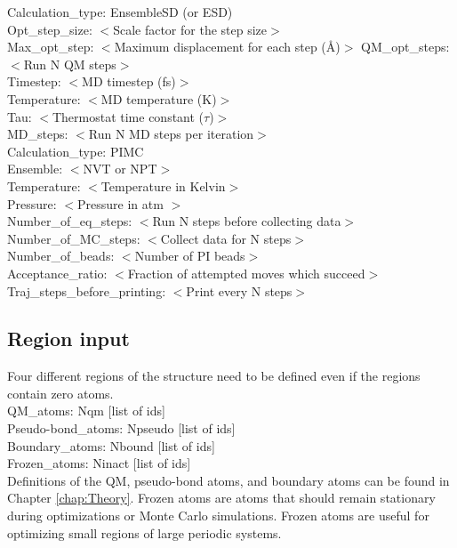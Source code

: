 \documentclass[12pt]{report}
\begin{document}
Calculation\_type: EnsembleSD (or ESD) \\
Opt\_step\_size: $<$Scale factor for the step size$>$ \\
Max\_opt\_step: $<$Maximum displacement for each step (\AA)$>$
QM\_opt\_steps: $<$Run N QM steps$>$ \\
Timestep: $<$MD timestep (fs)$>$ \\
Temperature: $<$MD temperature (K)$>$ \\
Tau: $<$Thermostat time constant ($\tau$)$>$ \\
MD\_steps: $<$Run N MD steps per iteration$>$ \\

Calculation\_type: PIMC \\
Ensemble: $<$NVT or NPT$>$ \\
Temperature: $<$Temperature in Kelvin$>$ \\
Pressure: $<$Pressure in atm $>$ \\
Number\_of\_eq\_steps: $<$Run N steps before collecting data$>$ \\
Number\_of\_MC\_steps: $<$Collect data for N steps$>$ \\
Number\_of\_beads: $<$Number of PI beads$>$ \\
Acceptance\_ratio: $<$Fraction of attempted moves which succeed$>$ \\
Traj\_steps\_before\_printing: $<$Print every N steps$>$ \\

\subsection{Region input}

Four different regions of the structure need to be defined even if the
regions contain zero atoms. \\

QM\_atoms: Nqm [list of ids] \\
Pseudo-bond\_atoms: Npseudo [list of ids] \\
Boundary\_atoms: Nbound [list of ids] \\
Frozen\_atoms: Ninact [list of ids] \\

Definitions of the QM, pseudo-bond atoms, and boundary atoms can be found in
Chapter \ref{chap:Theory}. Frozen atoms are atoms that should remain
stationary during optimizations or Monte Carlo simulations. Frozen atoms are
useful for optimizing small regions of large periodic systems. \\
\end{document}

